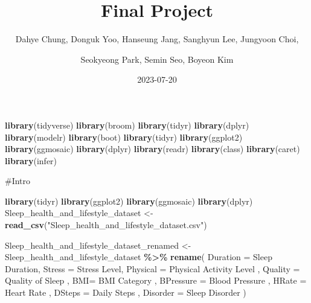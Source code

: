 \documentclass[
  11pt,
]{article}
\title{Final Project}
\author{Dahye Chung, Donguk Yoo, Hanseung Jang, Sanghyun Lee, Jungyoon
Choi, \and Seokyeong Park, Semin Seo, Boyeon Kim}
\date{2023-07-20}
\newenvironment{Shaded}{\begin{snugshade}}{\end{snugshade}}
\newcommand{\AttributeTok}[1]{\textcolor[rgb]{0.13,0.29,0.53}{#1}}
\newcommand{\FunctionTok}[1]{\textcolor[rgb]{0.13,0.29,0.53}{\textbf{#1}}}
\newcommand{\NormalTok}[1]{#1}
\newcommand{\OtherTok}[1]{\textcolor[rgb]{0.56,0.35,0.01}{#1}}
\newcommand{\SpecialCharTok}[1]{\textcolor[rgb]{0.81,0.36,0.00}{\textbf{#1}}}
\newcommand{\StringTok}[1]{\textcolor[rgb]{0.31,0.60,0.02}{#1}}
\begin{document}
\maketitle

\begin{Shaded}
\begin{Highlighting}[]
\FunctionTok{library}\NormalTok{(tidyverse)}
\FunctionTok{library}\NormalTok{(broom)}
\FunctionTok{library}\NormalTok{(tidyr)}
\FunctionTok{library}\NormalTok{(dplyr)}
\FunctionTok{library}\NormalTok{(modelr)}
\FunctionTok{library}\NormalTok{(boot)}
\FunctionTok{library}\NormalTok{(tidyr)}
\FunctionTok{library}\NormalTok{(ggplot2)}
\FunctionTok{library}\NormalTok{(ggmosaic)}
\FunctionTok{library}\NormalTok{(dplyr)}
\FunctionTok{library}\NormalTok{(readr)}
\FunctionTok{library}\NormalTok{(class)}
\FunctionTok{library}\NormalTok{(caret)}
\FunctionTok{library}\NormalTok{(infer)}
\end{Highlighting}
\end{Shaded}

\#Intro

\begin{Shaded}
\begin{Highlighting}[]
\FunctionTok{library}\NormalTok{(tidyr)}
\FunctionTok{library}\NormalTok{(ggplot2)}
\FunctionTok{library}\NormalTok{(ggmosaic)}
\FunctionTok{library}\NormalTok{(dplyr)}
\NormalTok{Sleep\_health\_and\_lifestyle\_dataset }\OtherTok{\textless{}{-}} \FunctionTok{read\_csv}\NormalTok{(}\StringTok{"Sleep\_health\_and\_lifestyle\_dataset.csv"}\NormalTok{)}
\end{Highlighting}
\end{Shaded}

\begin{Shaded}
\begin{Highlighting}[]
\NormalTok{Sleep\_health\_and\_lifestyle\_dataset\_renamed }\OtherTok{\textless{}{-}}\NormalTok{ Sleep\_health\_and\_lifestyle\_dataset }\SpecialCharTok{\%\textgreater{}\%}
  \FunctionTok{rename}\NormalTok{( }\AttributeTok{Duration =} \StringTok{\textquotesingle{}Sleep Duration\textquotesingle{}}\NormalTok{,}
          \AttributeTok{Stress =} \StringTok{\textquotesingle{}Stress Level\textquotesingle{}}\NormalTok{,}
          \AttributeTok{Physical =} \StringTok{\textquotesingle{}Physical Activity Level\textquotesingle{}}\NormalTok{ ,}
          \AttributeTok{Quality =} \StringTok{\textquotesingle{}Quality of Sleep\textquotesingle{}}\NormalTok{ ,}
          \AttributeTok{BMI=} \StringTok{\textquotesingle{}BMI Category\textquotesingle{}}\NormalTok{ ,}
          \AttributeTok{BPressure =} \StringTok{\textquotesingle{}Blood Pressure\textquotesingle{}}\NormalTok{ ,}
          \AttributeTok{HRate =} \StringTok{\textquotesingle{}Heart Rate\textquotesingle{}}\NormalTok{ ,}
          \AttributeTok{DSteps =} \StringTok{\textquotesingle{}Daily Steps\textquotesingle{}}\NormalTok{ ,}
          \AttributeTok{Disorder =} \StringTok{\textquotesingle{}Sleep Disorder\textquotesingle{}}\NormalTok{ )}
\end{Highlighting}
\end{Shaded}
\end{document}
